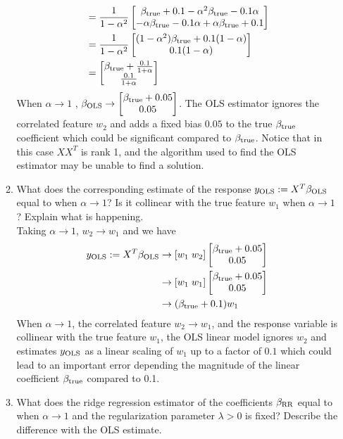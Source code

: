 \documentclass[12pt,twoside]{article}
\begin{document}
\begin{enumerate}
\begin{enumerate}
\begin{align*}
						&= 	\frac{1}{1-\alpha^2}  \begin{bmatrix} \beta_{\operatorname{true}} + 0.1 -\alpha^2 \beta_{\operatorname{true}} -0.1 \alpha \\ -\alpha \beta_{\operatorname{true}} -0.1 \alpha + \alpha \beta_{\operatorname{true}}  + 0.1 \end{bmatrix} \\
						&=	\frac{1}{1-\alpha^2}  \begin{bmatrix} (1-\alpha^2)  \beta_{\operatorname{true}} + 0.1 (1-\alpha) \\ 0.1 (1 - \alpha) \end{bmatrix} \\
						&=  	\begin{bmatrix} \beta_{\operatorname{true}} + \frac{0.1} {1 + \alpha} \\ \frac{0.1} {1 + \alpha} \end{bmatrix}
\end{align*}
When $\alpha \rightarrow 1$ , $\beta_{\operatorname{OLS}} \rightarrow   \begin{bmatrix} \beta_{\operatorname{true}} + 0.05  \\ 0.05 \end{bmatrix}$.
The OLS estimator ignores the correlated feature $w_2$ and adds a fixed bias $0.05$ to the true $\beta_{\operatorname{true}}$ coefficient which could be significant compared to
 $\beta_{\operatorname{true}}$. Notice that in this case $XX^T$ is rank 1, and the algorithm used to find the OLS estimator may be unable to find a solution.
    
   \item  What does the corresponding estimate of the response $y_{\operatorname{OLS}} := X^T\beta_{\operatorname{OLS}}$ equal to when $\alpha \rightarrow 1$? Is it collinear with the true feature $w_1$ when $\alpha \rightarrow 1$? Explain what is happening.\\
   
  \medskip
  Taking $\alpha \rightarrow 1$, $w_2 \rightarrow w_1$ and we have 
  \begin{align*}
	  y_{\operatorname{OLS}} := X^T\beta_{\operatorname{OLS}}	&\rightarrow [w_1 \; w_2]  \begin{bmatrix} \beta_{\operatorname{true}} + 0.05  \\ 0.05 \end{bmatrix} \\
	  								&\rightarrow [w_1 \; w_1] \begin{bmatrix} \beta_{\operatorname{true}} + 0.05  \\ 0.05 \end{bmatrix} \\
									&\rightarrow ( \beta_{\operatorname{true}} + 0.1) w_1
  \end{align*}
  When $\alpha \rightarrow 1$, the correlated feature $w_2 \rightarrow w_1$, and the response variable is collinear with the true feature $w_1$, the OLS linear model ignores $w_2$ and estimates $y_{\operatorname{OLS}}$ as a linear scaling of $w_1$ 
  up to a factor of $0.1$ which could lead to an important error depending the magnitude of the linear coefficient  $\beta_{\operatorname{true}}$ compared to 0.1.
    
  \item What does the ridge regression estimator of the coefficients $\beta_{\operatorname{RR}}$ equal to when $\alpha \rightarrow 1$ and the regularization parameter $\lambda >0$ is fixed? Describe the difference with the OLS estimate.\\
 

\end{enumerate}
\end{enumerate}
\end{document}
